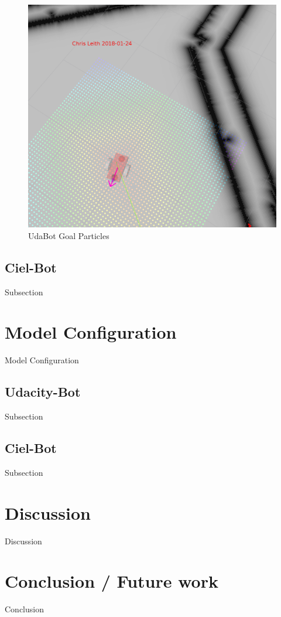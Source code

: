 \documentclass[10pt,journal,compsoc]{IEEEtran}
\begin{document}
\begin{figure}[h]
      \centering
      \includegraphics[width=\linewidth]{../Assets/writeupImages/udaBot_rvizGoal.png}
      \caption{UdaBot Goal Particles }
      \label{fig:UdaBot Goal Particles}
\end{figure}

\subsection{Ciel-Bot}
Subsection


\section{Model Configuration}
Model Configuration

\subsection{Udacity-Bot}
Subsection

\subsection{Ciel-Bot}
Subsection


\section{Discussion}
Discussion

\section{Conclusion / Future work}
Conclusion
\end{document}
